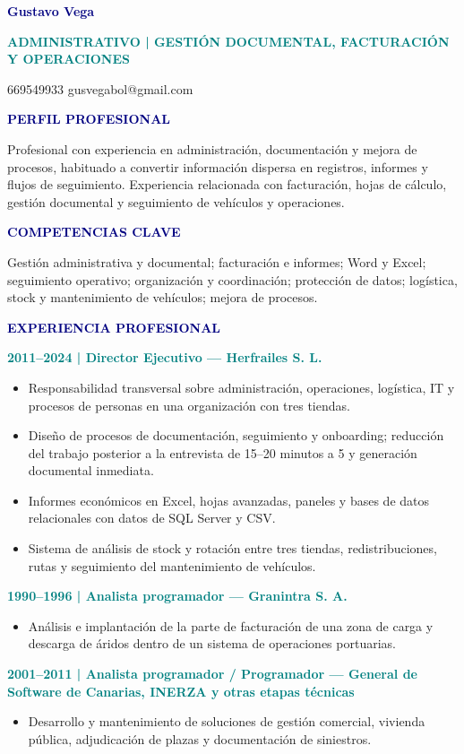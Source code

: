 \documentclass[10pt,a4paper]{article}
\newcommand{\sectiontitle}[1]{\vspace{5pt}\textcolor{navy}{\large\textbf{\MakeUppercase{#1}}}\par\vspace{2pt}}
\begin{document}
{\Huge\textcolor{navy}{\textbf{Gustavo Vega}}}\par
\textcolor{teal}{\textbf{ADMINISTRATIVO | GESTIÓN DOCUMENTAL, FACTURACIÓN Y OPERACIONES}}\par
669549933 \quad\textbullet\quad gusvegabol@gmail.com

\sectiontitle{Perfil profesional}
Profesional con experiencia en administración, documentación y mejora de procesos, habituado a convertir información dispersa en registros, informes y flujos de seguimiento. Experiencia relacionada con facturación, hojas de cálculo, gestión documental y seguimiento de vehículos y operaciones.

\sectiontitle{Competencias clave}
Gestión administrativa y documental; facturación e informes; Word y Excel; seguimiento operativo; organización y coordinación; protección de datos; logística, stock y mantenimiento de vehículos; mejora de procesos.

\sectiontitle{Experiencia profesional}
\textcolor{teal}{\textbf{2011--2024 | Director Ejecutivo — Herfrailes S. L.}}
\begin{itemize}
\item Responsabilidad transversal sobre administración, operaciones, logística, IT y procesos de personas en una organización con tres tiendas.
\item Diseño de procesos de documentación, seguimiento y onboarding; reducción del trabajo posterior a la entrevista de 15--20 minutos a 5 y generación documental inmediata.
\item Informes económicos en Excel, hojas avanzadas, paneles y bases de datos relacionales con datos de SQL Server y CSV.
\item Sistema de análisis de stock y rotación entre tres tiendas, redistribuciones, rutas y seguimiento del mantenimiento de vehículos.
\end{itemize}
\textcolor{teal}{\textbf{1990--1996 | Analista programador — Granintra S. A.}}
\begin{itemize}\item Análisis e implantación de la parte de facturación de una zona de carga y descarga de áridos dentro de un sistema de operaciones portuarias.\end{itemize}
\textcolor{teal}{\textbf{2001--2011 | Analista programador / Programador — General de Software de Canarias, INERZA y otras etapas técnicas}}
\begin{itemize}\item Desarrollo y mantenimiento de soluciones de gestión comercial, vivienda pública, adjudicación de plazas y documentación de siniestros.\end{itemize}
\end{document}
